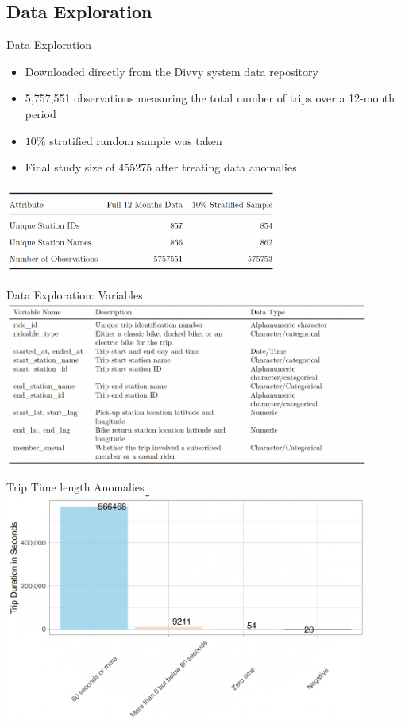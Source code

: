 \documentclass[11pt, xcolor=dvipsnames]{beamer}
\begin{document}
	\subsection{Data Exploration}
	 \begin{frame}{Data Exploration}
	 	\begin{itemize}
	 		\item Downloaded directly from the Divvy system data repository
	 		\item 5,757,551 observations measuring the total number of trips over a 12-month period
	 		\item $10\%$ stratified random sample  was taken
	 		\item Final study size of 455275 after treating data anomalies
	 	\end{itemize}
 	\centering
 	\includegraphics[width=9cm]{images/fulldata-vs-stratified}
 	
	 \end{frame}
 
    \begin{frame}{Data Exploration: Variables}
   	  \includegraphics[width=12cm]{images/variables}
    \end{frame}

   \begin{frame}{Trip Time length Anomalies}
  			\includegraphics[width=12cm]{images/time-anomaly}
   \end{frame}
 
\end{document}
